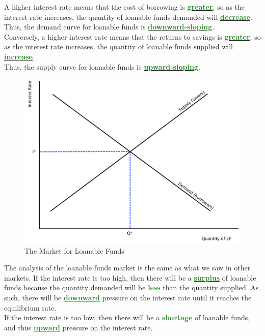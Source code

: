 \documentclass[11pt]{article}\usepackage[]{graphicx}\usepackage[]{color}
\theoremstyle{definition}
\newcommand{\dd}[1]{{\underline{\textbf{\textcolor{ForestGreen}{#1}}}}}
\begin{document}
A higher interest rate means that the cost of borrowing is \dd{greater}, so as the interest rate increases, the quantity of loanable funds demanded will \dd{decrease}. 
\\

Thus, the demand curve for loanable funds is \dd{downward-sloping}. 
\\

Conversely, a higher interest rate means that the returns to savings is \dd{greater}, so as the interest rate increases, the quantity of loanable funds supplied will \dd{increase}. 
\\

Thus, the supply curve for loanable funds is \dd{upward-sloping}. 

	\begin{figure}[H]
		\centering
		\includegraphics[scale=.40]{plot89.pdf}
		\caption{The Market for Loanable Funds}
	\end{figure}


The analysis of the loanable funds market is the same as what we saw in other markets. If the interest rate is too high, then there will be a \dd{surplus} of loanable funds because the quantity demanded will be \dd{less} than the quantity supplied. As such, there will be \dd{downward} pressure on the interest rate until it reaches the equilibrium rate. 
\\

If the interest rate is too low, then there will be a \dd{shortage} of loanable funds, and thus \dd{upward} pressure on the interest rate.
\\
\end{document}
